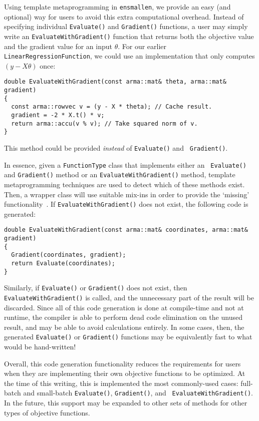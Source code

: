 \documentclass{article}
\begin{document}
Using template metaprogramming in {\tt ensmallen}, we provide an easy (and
optional) way for users to avoid this extra computational overhead.  Instead of
specifying individual {\tt Evaluate()} and {\tt Gradient()} functions, a user
may simply write an {\tt EvaluateWithGradient()} function that returns both the
objective value and the gradient value for an input $\theta$.  For our earlier
\texttt{LinearRegressionFunction}, we could use an implementation that only
computes $(y - X \theta)$ once:

\begin{verbatim}
double EvaluateWithGradient(const arma::mat& theta, arma::mat& gradient)
{
  const arma::rowvec v = (y - X * theta); // Cache result.
  gradient = -2 * X.t() * v;
  return arma::accu(v % v); // Take squared norm of v.
}
\end{verbatim}

This method could be provided {\it instead} of {\tt Evaluate()} and {\tt
Gradient()}.

In essence, given a {\tt FunctionType} class that implements either an {\tt
Evaluate()} and {\tt Gradient()} method or an {\tt EvaluateWithGradient()}
method, template metaprogramming techniques are used to detect which of these
methods exist.  Then, a wrapper class will use suitable mix-ins
in order to provide the `missing' functionality~\cite{smaragdakis2000mixin}.  If
{\tt EvaluateWithGradient()} does not exist, the following code is generated:

\begin{verbatim}
double EvaluateWithGradient(const arma::mat& coordinates, arma::mat& gradient)
{
  Gradient(coordinates, gradient);
  return Evaluate(coordinates);
}
\end{verbatim}

Similarly, if {\tt Evaluate()} or {\tt Gradient()} does not exist, then {\tt
EvaluateWithGradient()} is called, and the unnecessary part of the result will
be discarded.  Since all of this code generation is done at compile-time and not
at runtime, the compiler is able to perform dead code elimination %
on the unused result, and may be able to avoid calculations entirely.  In some
cases, then, the generated {\tt Evaluate()} or {\tt Gradient()} functions may be
equivalently fast to what would be hand-written!

Overall, this code generation functionality reduces the requirements for users
when they are implementing their own objective functions to be optimized.  At
the time of this writing, this is implemented the most commonly-used cases:
full-batch and small-batch {\tt Evaluate()}, {\tt Gradient()}, and {\tt
EvaluateWithGradient()}.  In the future, this support may be expanded to other
sets of methods for other types of objective functions.
\end{document}
